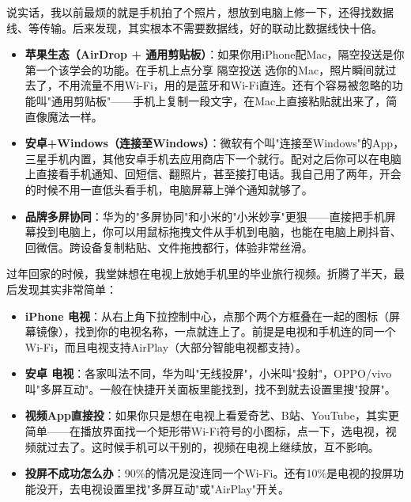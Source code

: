 


说实话，我以前最烦的就是手机拍了个照片，想放到电脑上修一下，还得找数据线、等传输。后来发现，其实根本不需要数据线，好的联动比数据线快十倍。

\begin{itemize}
  \item \textbf{苹果生态（AirDrop + 通用剪贴板）}：如果你用iPhone配Mac，隔空投送是你第一个该学会的功能。在手机上点分享 隔空投送 选你的Mac，照片瞬间就过去了，不用流量不用Wi-Fi，用的是蓝牙和Wi-Fi直连。还有个容易被忽略的功能叫"通用剪贴板"——手机上复制一段文字，在Mac上直接粘贴就出来了，简直像魔法一样。
  \item \textbf{安卓+Windows（连接至Windows）}：微软有个叫"连接至Windows"的App，三星手机内置，其他安卓手机去应用商店下一个就行。配对之后你可以在电脑上直接看手机通知、回短信、翻照片，甚至接打电话。我自己用了两年，开会的时候不用一直低头看手机，电脑屏幕上弹个通知就够了。
  \item \textbf{品牌多屏协同}：华为的"多屏协同"和小米的"小米妙享"更狠——直接把手机屏幕投到电脑上，你可以用鼠标拖拽文件从手机到电脑，也能在电脑上刷抖音、回微信。跨设备复制粘贴、文件拖拽都行，体验非常丝滑。
\end{itemize}


过年回家的时候，我堂妹想在电视上放她手机里的毕业旅行视频。折腾了半天，最后发现其实非常简单：

\begin{itemize}
  \item \textbf{iPhone 电视}：从右上角下拉控制中心，点那个两个方框叠在一起的图标（屏幕镜像），找到你的电视名称，一点就连上了。前提是电视和手机连的同一个Wi-Fi，而且电视支持AirPlay（大部分智能电视都支持）。
  \item \textbf{安卓 电视}：各家叫法不同，华为叫"无线投屏"，小米叫"投射"，OPPO/vivo叫"多屏互动"。一般在快捷开关面板里能找到，找不到就去设置里搜"投屏"。
  \item \textbf{视频App直接投}：如果你只是想在电视上看爱奇艺、B站、YouTube，其实更简单——在播放界面找一个矩形带Wi-Fi符号的小图标，点一下，选电视，视频就过去了。这时候手机可以干别的，视频在电视上继续放，互不影响。
  \item \textbf{投屏不成功怎么办}：90\%的情况是没连同一个Wi-Fi。还有10\%是电视的投屏功能没开，去电视设置里找"多屏互动"或"AirPlay"开关。
\end{itemize}

